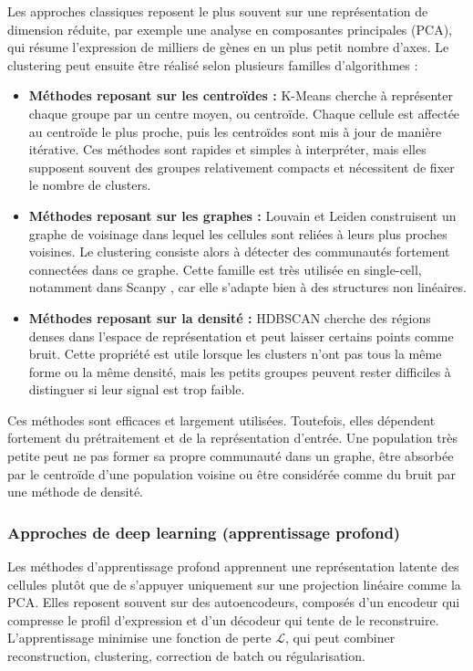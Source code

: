 Les approches classiques reposent le plus souvent sur une représentation de dimension réduite, par exemple une analyse en composantes principales (PCA), qui résume l'expression de milliers de gènes en un plus petit nombre d'axes. Le clustering peut ensuite être réalisé selon plusieurs familles d'algorithmes :
\begin{itemize}
    \item \textbf{Méthodes reposant sur les centroïdes :} K-Means \cite{macqueen1967some} cherche à représenter chaque groupe par un centre moyen, ou centroïde. Chaque cellule est affectée au centroïde le plus proche, puis les centroïdes sont mis à jour de manière itérative. Ces méthodes sont rapides et simples à interpréter, mais elles supposent souvent des groupes relativement compacts et nécessitent de fixer le nombre de clusters.
    \item \textbf{Méthodes reposant sur les graphes :} Louvain \cite{blondel2008fast} et Leiden \cite{Traag2019Leiden} construisent un graphe de voisinage dans lequel les cellules sont reliées à leurs plus proches voisines. Le clustering consiste alors à détecter des communautés fortement connectées dans ce graphe. Cette famille est très utilisée en single-cell, notamment dans Scanpy \cite{Wolf2018Scanpy}, car elle s'adapte bien à des structures non linéaires.
    \item \textbf{Méthodes reposant sur la densité :} HDBSCAN \cite{Campello2015HDBSCAN} cherche des régions denses dans l'espace de représentation et peut laisser certains points comme bruit. Cette propriété est utile lorsque les clusters n'ont pas tous la même forme ou la même densité, mais les petits groupes peuvent rester difficiles à distinguer si leur signal est trop faible.
\end{itemize}

Ces méthodes sont efficaces et largement utilisées. Toutefois, elles dépendent fortement du prétraitement et de la représentation d'entrée. Une population très petite peut ne pas former sa propre communauté dans un graphe, être absorbée par le centroïde d'une population voisine ou être considérée comme du bruit par une méthode de densité.

\subsubsection{Approches de deep learning (apprentissage profond)}

Les méthodes d'apprentissage profond apprennent une représentation latente des cellules plutôt que de s'appuyer uniquement sur une projection linéaire comme la PCA. Elles reposent souvent sur des autoencodeurs, composés d'un encodeur qui compresse le profil d'expression et d'un décodeur qui tente de le reconstruire. L'apprentissage minimise une fonction de perte \(\mathcal{L}\), qui peut combiner reconstruction, clustering, correction de batch ou régularisation.

